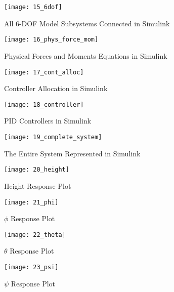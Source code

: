 \begin{figure}[h]
    \centering
    \texttt{[image: 15\_6dof]}
    \caption{All 6-DOF Model Subsystems Connected in Simulink}
    \label{fig:6dof}
\end{figure}

\begin{figure}[h]
    \centering
    \texttt{[image: 16\_phys\_force\_mom]}
    \caption{Physical Forces and Moments Equations in Simulink}
    \label{fig:phys_force_mom}
\end{figure}

\begin{figure}[h]
    \centering
    \texttt{[image: 17\_cont\_alloc]}
    \caption{Controller Allocation in Simulink}
    \label{fig:cont_alloc}
\end{figure}

\begin{figure}[h]
    \centering
    \texttt{[image: 18\_controller]}
    \caption{PID Controllers in Simulink}
    \label{fig:cont}
\end{figure}

\begin{figure}[h]
    \centering
    \texttt{[image: 19\_complete\_system]}
    \caption{The Entire System Represented in Simulink}
    \label{fig:}
\end{figure}

\begin{figure}[h]
    \centering
    \texttt{[image: 20\_height]}
    \caption{Height Response Plot}
    \label{fig:height}
\end{figure}

\begin{figure}[h]
    \centering
    \texttt{[image: 21\_phi]}
    \caption{$\phi$ Response Plot}
    \label{fig:phi}
\end{figure}

\begin{figure}[h]
    \centering
    \texttt{[image: 22\_theta]}
    \caption{$\theta$ Response Plot}
    \label{fig:theta}
\end{figure}

\begin{figure}[h]
    \centering
    \texttt{[image: 23\_psi]}
    \caption{$\psi$ Response Plot}
    \label{fig:psi}
\end{figure}